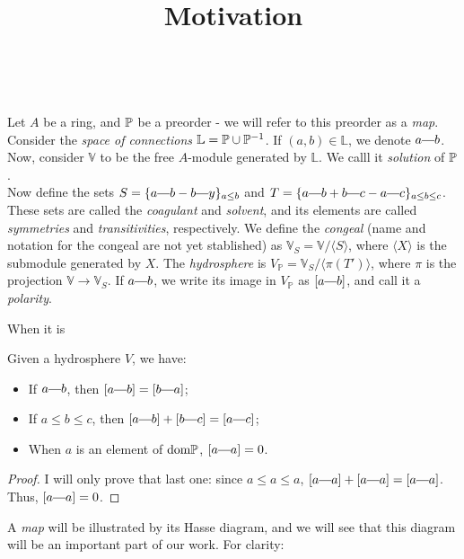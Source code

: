 


\title{Motivation}\


	\maketitle
\begin{definition}
    Let $A$ be a ring, and $\mathbb{P}$ be a preorder - we will refer to this preorder
    as a \textit{map}. 
    Consider the \textit{space of connections} $\mathbb{L} = \mathbb{P} \cup \mathbb{P}^{-1}$.
    If $(a, b) \in \mathbb{L}$, we denote $a \connect b$.
    Now, consider $\mathbb{V}$ to be the free $A$-module generated by $\mathbb{L}$.
    We calll it \textit{solution} of $\mathbb{P}$.\\
    Now define the sets $S = \{ a \connect b - b \connect y\}_{a \leq b}$ and $T = \{ a \connect b + b \connect c - a \connect c\}_{a \leq b \leq c}$. These sets are called the \textit{coagulant} and \textit{solvent}, and its elements are called \textit{symmetries} and \textit{transitivities}, respectively. We define the \textit{congeal} (name and notation for the congeal are not yet stablished) as $\mathbb{V}_S = \mathbb{V} / \langle S \rangle$, where $\langle X \rangle$ is the submodule generated by $X$. The \textit{hydrosphere} is $V_\mathbb{P} = \mathbb{V}_S/\langle \pi(T') \rangle$, where $\pi$ is the projection $\mathbb{V} \to \mathbb{V}_S$. If $a \connect b$, we write its image in $V_\mathbb{P}$ as $[a \connect b]$, and call it a \textit{polarity}.
\end{definition}
\par When it is
\begin{prop}
	Given a hydrosphere $V$, we have:
	\begin{itemize}
		\item If $a \connect b$, then $[a \connect b] = [b \connect a]$;
		\item If $a \leq b \leq c$, then $[a \connect b] + [b \connect c] = [a \connect c]$;
		\item When $a$ is an element of $\text{dom} \mathbb{P}$, $[a \connect a] = 0$.
	\end{itemize}
\end{prop}
\begin{proof}
	I will only prove that last one: since $a \leq a \leq a$, $[a \connect a] + [a \connect a] = [a \connect a]$. Thus, $[a \connect a] = 0$.
\end{proof}
\par A \textit{map} will be illustrated by its Hasse diagram, and we will see that this diagram will be an important part of our work. For clarity:

